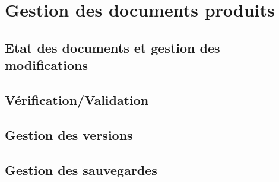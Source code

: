 \section{Gestion des documents produits}
\subsection{Etat des documents et gestion des modifications}
\subsection{Vérification/Validation}
\subsection{Gestion des versions}
\subsection{Gestion des sauvegardes}
